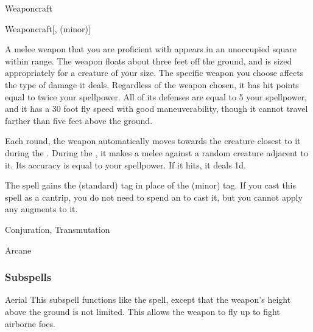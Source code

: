 \newpage
\begin{spellsection}{Weaponcraft}

\begin{spellheader}
\end{spellheader}


\begin{ability}{Weaponcraft}[,  (minor)]

A melee weapon that you are proficient with appears in an unoccupied square within \rngmed range.
The weapon floats about three feet off the ground, and is sized appropriately for a creature of your size.
The specific weapon you choose affects the type of damage it deals.
Regardless of the weapon chosen, it has hit points equal to twice your spellpower.
All of its defenses are equal to 5 \add your spellpower, and it has a 30 foot fly speed with good maneuverability, though it cannot travel farther than five feet above the ground.

Each round, the weapon automatically moves towards the creature closest to it during the .
During the , it makes a melee  against a random creature adjacent to it.
Its accuracy is equal to your spellpower.
If it hits, it deals  \minus1d.

\end{ability}



 The spell gains the  (standard) tag in place of the  (minor) tag. If you cast this spell as a cantrip,
you do not need to spend an  to cast it,
but you cannot apply any augments to it.


 Conjuration, Transmutation

 Arcane
\end{spellsection}


\subsubsection{Subspells}


\begin{ability}[\nth{2}]{Aerial}
This subspell functions like the  spell, except that the weapon's height above the ground is not limited.
This allows the weapon to fly up to fight airborne foes.
\end{ability}
\vspace{0.25em}


